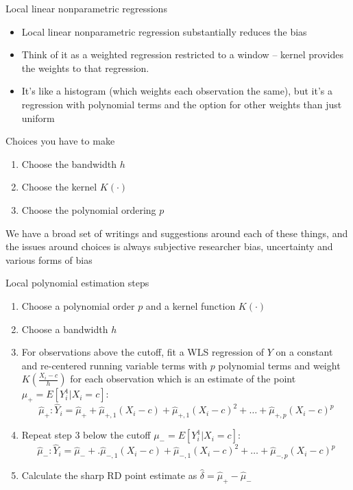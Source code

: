 \documentclass{beamer}
\begin{document}
\begin{frame}{Local linear nonparametric regressions}
	
	\begin{itemize}
	\item Local linear nonparametric regression substantially reduces the bias
	\item Think of it as a weighted regression restricted to a window -- kernel provides the weights to that regression.  
	\item It's like a histogram (which weights each observation the same), but it's a regression with polynomial terms and the option for other weights than just uniform
	\end{itemize}
	
\end{frame}


\begin{frame}{Choices you have to make}

\begin{enumerate}
\item Choose the bandwidth $h$
\item Choose the kernel $K(\cdot)$
\item Choose the polynomial ordering $p$
\end{enumerate}
\bigskip
We have a broad set of writings and suggestions around each of these things, and the issues around choices is always subjective researcher bias, uncertainty and various forms of bias

\end{frame}



\begin{frame}{Local polynomial estimation steps}

\begin{enumerate}
\item Choose a polynomial order $p$ and a kernel function $K(\cdot)$
\item Choose a bandwidth $h$
\item For observations above the cutoff, fit a WLS regression of $Y$ on a constant and re-centered running variable terms with $p$ polynomial terms and weight $K(\frac{X_i-c}{h})$ for each observation which is an estimate of the point$\mu_+=E[Y_i^1|X_i=c]$:$$\widehat{\mu}_+:\widehat{Y}_i=\widehat{\mu}_+ + \widehat{\mu}_{+,1}(X_i-c)+\widehat{\mu}_{+,1}(X_i-c)^2 + \dots + \widehat{\mu}_{+,p}(X_i-c)^p$$
\item Repeat step 3 below the cutoff $\mu_-=E[Y_i^1|X_i=c]$:$$\widehat{\mu}_-:\widehat{Y}_i=\widehat{\mu}_- +. \widehat{\mu}_{-,1}(X_i-c)+\widehat{\mu}_{-,1}(X_i-c)^2 + \dots + \widehat{\mu}_{-,p}(X_i-c)^p$$
\item Calculate the sharp RD point estimate as $\widehat{\delta}=\widehat{\mu}_+ - \widehat{\mu}_-$
\end{enumerate}

\end{frame}
\end{document}
